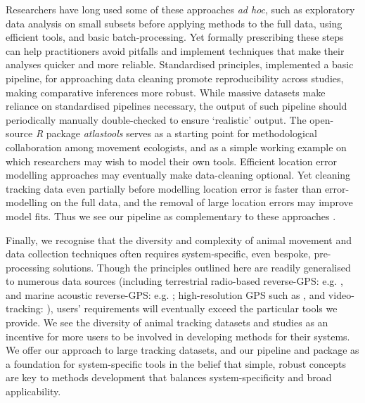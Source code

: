 \begin{refsection}[sorting=nyt]
    Researchers have long used some of these approaches \textit{ad hoc}, such as exploratory data analysis on small subsets before applying methods to the full data, using efficient tools, and basic batch-processing. 
    Yet formally prescribing these steps can help practitioners avoid pitfalls and implement techniques that make their analyses quicker and more reliable.
    Standardised principles, implemented a basic pipeline, for approaching data cleaning promote reproducibility across studies, making comparative inferences more robust.
    While massive datasets make reliance on standardised pipelines necessary, the output of such pipeline should periodically manually double-checked to ensure `realistic' output.
    The open-source \textit{R} package \textit{atlastools} serves as a starting point for methodological collaboration among movement ecologists, and as a simple working example on which researchers may wish to model their own tools.
    Efficient location error modelling approaches \citep{fleming2020, aspillaga2021} may eventually make data-cleaning optional.
    Yet cleaning tracking data even partially before modelling location error is faster than error-modelling on the full data, and the removal of large location errors may improve model fits.
    Thus we see our pipeline as complementary to these approaches \citep{fleming2014a, fleming2020}.

    Finally, we recognise that the diversity and complexity of animal movement and data collection techniques often requires system-specific, even bespoke, pre-processing solutions.
    Though the principles outlined here are readily generalised to numerous data sources (including terrestrial radio-based reverse-GPS: e.g. \citealt{toledo2020}, and marine acoustic reverse-GPS: e.g. \citealt{aspillaga2021}; high-resolution GPS such as \citealt{strandburg-peshkin2015}, and video-tracking: \citealt{rathore2020}), users' requirements will eventually exceed the particular tools we provide.
    We see the diversity of animal tracking datasets and studies as an incentive for more users to be involved in developing methods for their systems.
    We offer our approach to large tracking datasets, and our pipeline and package as a foundation for system-specific tools in the belief that simple, robust concepts are key to methods development that balances system-specificity and broad applicability.

    \printbibliography[title=Preprocessing,sorting=nyt,heading=subbibliography]
\end{refsection}